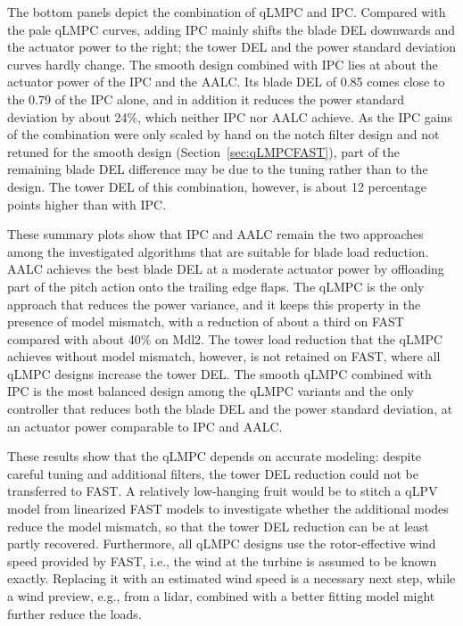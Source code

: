 The bottom panels depict the combination of qLMPC and IPC. Compared with the pale qLMPC curves, adding
IPC mainly shifts the blade DEL downwards and the actuator power to the right; the tower DEL and
the power standard deviation curves hardly change. The smooth design combined with IPC lies at
about the actuator power of the IPC and the AALC. Its blade DEL of 0.85 comes close to the 0.79 of
the IPC alone, and in addition it reduces the power standard deviation by about 24\%, which
neither IPC nor AALC achieve. As the IPC gains of the combination were only scaled by hand on the
notch filter design and not retuned for the smooth design (Section~\ref{sec:qLMPCFAST}), part of
the remaining blade DEL difference may be due to the tuning rather than to the design. The tower
DEL of this combination, however, is about 12 percentage points higher than with IPC.



These summary plots show that IPC and AALC remain the two approaches among the investigated algorithms that are suitable for blade load reduction. AALC achieves the best blade DEL at a moderate actuator power by offloading part of the pitch action onto the trailing edge flaps. The qLMPC is the only approach that reduces the power variance, and it keeps this property in the presence of model mismatch, with a reduction of about a third on FAST compared with about 40\% on Mdl2. The tower load reduction that the qLMPC achieves without model mismatch, however, is not retained on FAST, where all qLMPC designs increase the tower DEL. The smooth qLMPC combined with IPC is the most balanced design among the qLMPC variants and the only controller that reduces both the blade DEL and the power standard deviation, at an actuator power comparable to IPC and AALC.

These results show that the qLMPC depends on accurate modeling: despite careful tuning and additional filters, the tower DEL reduction could not be transferred to FAST. A relatively low-hanging fruit would be to stitch a qLPV model from linearized FAST models to investigate whether the additional modes reduce the model mismatch, so that the tower DEL reduction can be at least partly recovered. Furthermore, all qLMPC designs use the rotor-effective wind speed provided by FAST, i.e., the wind at the turbine is assumed to be known exactly. Replacing it with an estimated wind speed is a necessary next step, while a wind preview, e.g., from a lidar, combined with a better fitting model might further reduce the loads.

